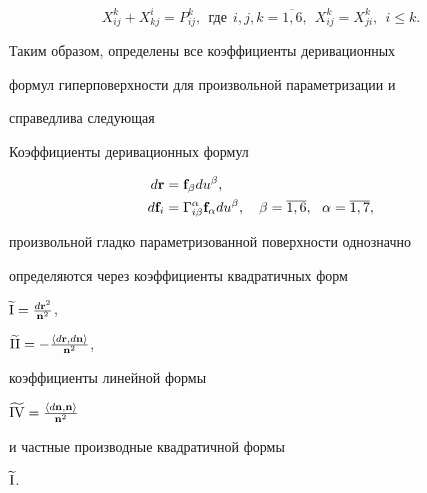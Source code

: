 $$


X_{ij}^k+X_{kj}^i=P_{ij}^k,


\ \ \text{где}\ \ i,j,k=\overline{1,6},\ \


X_{ij}^k=X_{ji}^k,\ \ i\leq k.


$$


Таким образом, определены все коэффициенты деривационных


формул гиперповерхности для произвольной параметризации и


справедлива следующая








\begin{thm}


Коэффициенты деривационных формул


\begin{align*}


d\bold{r}&=\bold{f}_\beta du^\beta, \\


d\bold{f}_i&=\Gamma_{i\beta}^\alpha \bold{f}_\alpha


du^\beta,


\quad \beta=\overline{1,6},\ \ \alpha=\overline{1,7},


\end{align*}


произвольной гладко параметризованной поверхности однозначно


определяются через коэффициенты квадратичных форм


$\widetilde{\mathrm{I}}=\frac{d\bold{r}^2}{\bold{n}^2}$,


$\widetilde{\matii}=-\frac{\langle


d\bold{r},d\bold{n}\rangle}{\bold{n}^2}$,


коэффициенты линейной формы


$\widetilde{\mathrm{IV}}=\frac{\langle


d\bold{n},\bold{n}\rangle}{\bold{n}^2}$


и частные производные квадратичной формы


$\widetilde{\mathrm{I}}$.


\end{thm}






